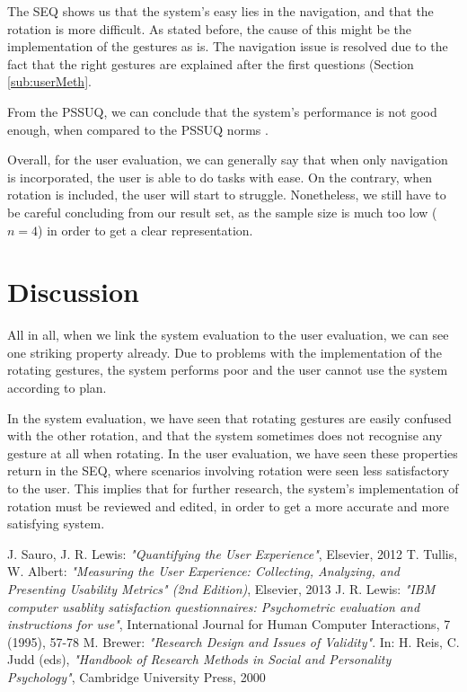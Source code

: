 \documentclass[11pt,a4paper]{article}
\begin{document}
The SEQ shows us that the system's easy lies in the navigation, and that the rotation is more difficult. As stated before, the cause of this might be the implementation of the gestures as is. The navigation issue is resolved due to the fact that the right gestures are explained after the first questions (Section \ref{sub:userMeth}.

From the PSSUQ, we can conclude that the system's performance is not good enough, when compared to the PSSUQ norms \cite{Quantify}. 

Overall, for the user evaluation, we can generally say that when only navigation is incorporated, the user is able to do tasks with ease. On the contrary, when rotation is included, the user will start to struggle. Nonetheless, we still have to be careful concluding from our result set, as the sample size is much too low ($n=4$) in order to get a clear representation.  

\section{Discussion}
All in all, when we link the system evaluation to the user evaluation, we can see one striking property already. Due to problems with the implementation of the rotating gestures, the system performs poor and the user cannot use the system according to plan. 

In the system evaluation, we have seen that rotating gestures are easily confused with the other rotation, and that the system sometimes does not recognise any gesture at all when rotating. In the user evaluation, we have seen these properties return in the SEQ, where scenarios involving rotation were seen less satisfactory to the user.
This implies that for further research, the system's implementation of rotation must be reviewed and edited, in order to get a more accurate and more satisfying system.



 J. Sauro, J. R. Lewis: \textit{"Quantifying the User Experience"}, Elsevier, 2012
 T. Tullis, W. Albert: \textit{"Measuring the User Experience: Collecting, Analyzing, and Presenting Usability Metrics" (2nd Edition)}, Elsevier, 2013 
 J. R. Lewis: \textit{"IBM computer usablity satisfaction questionnaires: Psychometric evaluation and instructions for use"}, International Journal for Human Computer Interactions, 7 (1995), 57-78
 M. Brewer: \textit{"Research Design and Issues of Validity"}. In: H. Reis, C. Judd (eds), \textit{"Handbook of Research Methods in Social and Personality Psychology"}, Cambridge University Press, 2000
\end{document}
